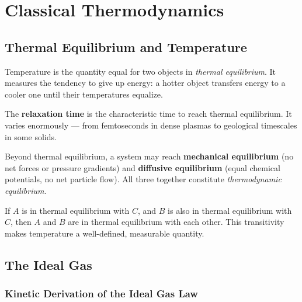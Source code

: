 \chapter{Classical Thermodynamics}

\section{Thermal Equilibrium and Temperature}

\begin{definition}[Temperature]
Temperature is the quantity equal for two objects in \emph{thermal equilibrium}. It measures the tendency to give up energy: a hotter object transfers energy to a cooler one until their temperatures equalize.
\end{definition}

\begin{definition}
The \textbf{relaxation time} is the characteristic time to reach thermal equilibrium. It varies enormously --- from femtoseconds in dense plasmas to geological timescales in some solids.
\end{definition}

Beyond thermal equilibrium, a system may reach \textbf{mechanical equilibrium} (no net forces or pressure gradients) and \textbf{diffusive equilibrium} (equal chemical potentials, no net particle flow). All three together constitute \emph{thermodynamic equilibrium}.

\begin{fact}
If $A$ is in thermal equilibrium with $C$, and $B$ is also in thermal equilibrium with $C$, then $A$ and $B$ are in thermal equilibrium with each other. This transitivity makes temperature a well-defined, measurable quantity.
\end{fact}

\section{The Ideal Gas}

\subsection{Kinetic Derivation of the Ideal Gas Law}

